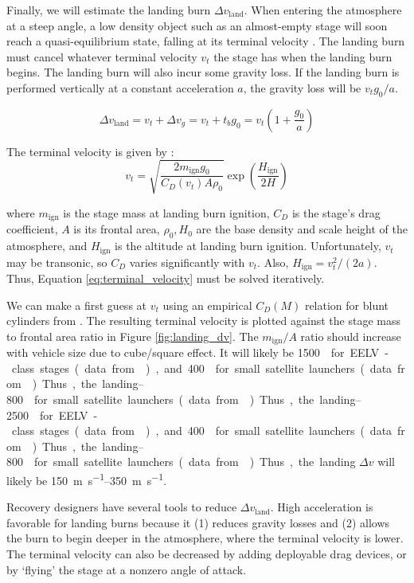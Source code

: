 \documentclass[conf]{new-aiaa}
\begin{document}
Finally, we will estimate the landing burn $\Delta v_{\mathrm{land}}$. When entering the atmosphere at a steep angle, a low density object such as an almost-empty stage will soon reach a quasi-equilibrium state, falling at its terminal velocity \cite{Wiesel2010}. The landing burn must cancel whatever terminal velocity $v_t$ the stage has when the landing burn begins. The landing burn will also incur some gravity loss. If the landing burn is performed vertically at a constant acceleration $a$, the gravity loss will be $v_t g_0 / a$.

\begin{equation}
\Delta v_{\mathrm{land}} = v_t + \Delta v_{g} = v_t + t_b g_0 = v_t(1 + \frac{g_0}{a})
\end{equation}

The terminal velocity is given by \cite{Wiesel2010}:
\begin{equation}
\label{eq:terminal_velocity}
v_t = \sqrt{\frac{2 m_{\mathrm{ign}} g_0}{C_D(v_t) A \rho_{0}}} \exp\left( \frac{H_\mathrm{ign}}{2H} \right)
\end{equation}

where $m_{\mathrm{ign}}$ is the stage mass at landing burn ignition, $C_D$ is the stage's drag coefficient, $A$ is its frontal area, $\rho_0, H_0$ are the base density and scale height of the atmosphere, and $H_\mathrm{ign}$ is the altitude at landing burn ignition. Unfortunately, $v_t$ may be transonic, so $C_D$ varies significantly with $v_t$. Also, $H_\mathrm{ign} = v_t^2 / (2 a)$.  Thus, Equation \ref{eq:terminal_velocity} must be solved iteratively.

We can make a first guess at $v_t$ using an empirical $C_D(M)$ relation for blunt cylinders from \cite{Hoerner1965}. The resulting terminal velocity is plotted against the stage mass to frontal area ratio in Figure \ref{fig:landing_dv}. The $m_{\mathrm{ign}}/A$ ratio should increase with vehicle size due to cube/square effect. It will likely be \SIrange{1500}{2500}{\kilogram\per\meter\square} for EELV-class stages (data from \cite{wade:atlas, braeunig:delta, wiki:Falcon9FullThrust}), and \SIrange{400}{800}{\kilogram\per\meter\square} for small satellite launchers (data from \cite{electron}). Thus, the landing $\Delta v$ will likely be \SIrange{150}{350}{\meter\per\second}.

Recovery designers have several tools to reduce $\Delta v_{\mathrm{land}}$. High acceleration is favorable for landing burns because it (1) reduces gravity losses and (2) allows the burn to begin deeper in the atmosphere, where the terminal velocity is lower. The terminal velocity can also be decreased by adding deployable drag devices, or by `flying' the stage at a nonzero angle of attack.
\end{document}
